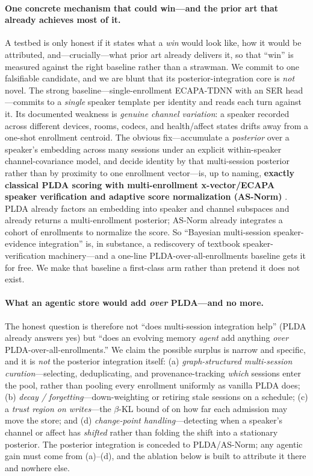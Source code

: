 \paragraph{One concrete mechanism that could win---and the prior art that already achieves most of it.} A testbed is only honest if it states what a \emph{win} would look like, how it would be attributed, and---crucially---what prior art already delivers it, so that ``win'' is measured against the right baseline rather than a strawman. We commit to one falsifiable candidate, and we are blunt that its posterior-integration core is \emph{not} novel. The strong baseline---single-enrollment ECAPA-TDNN with an SER head---commits to a \emph{single} speaker template per identity and reads each turn against it. Its documented weakness is \emph{genuine channel variation}: a speaker recorded across different devices, rooms, codecs, and health/affect states drifts away from a one-shot enrollment centroid. The obvious fix---accumulate a \emph{posterior} over a speaker's embedding across many sessions under an explicit within-speaker channel-covariance model, and decide identity by that multi-session posterior rather than by proximity to one enrollment vector---is, up to naming, \textbf{exactly classical PLDA scoring with multi-enrollment x-vector/ECAPA speaker verification and adaptive score normalization (AS-Norm)} \citep{xvector2021,ecapatdnn2020}. PLDA already factors an embedding into speaker and channel subspaces and already returns a multi-enrollment posterior; AS-Norm already integrates a cohort of enrollments to normalize the score. So ``Bayesian multi-session speaker-evidence integration'' is, in substance, a rediscovery of textbook speaker-verification machinery---and a one-line PLDA-over-all-enrollments baseline gets it for free. We make that baseline a first-class arm rather than pretend it does not exist.

\paragraph{What an agentic store would add \emph{over} PLDA---and no more.} The honest question is therefore not ``does multi-session integration help'' (PLDA already answers yes) but ``does an evolving memory \emph{agent} add anything \emph{over} PLDA-over-all-enrollments.'' We claim the possible surplus is narrow and specific, and it is \emph{not} the posterior integration itself: (a) \emph{graph-structured multi-session curation}---selecting, deduplicating, and provenance-tracking \emph{which} sessions enter the pool, rather than pooling every enrollment uniformly as vanilla PLDA does; (b) \emph{decay / forgetting}---down-weighting or retiring stale sessions on a schedule; (c) a \emph{trust region on writes}---the $\beta$-KL bound of  on how far each admission may move the store; and (d) \emph{change-point handling}---detecting when a speaker's channel or affect has \emph{shifted} rather than folding the shift into a stationary posterior. The posterior integration is conceded to PLDA/AS-Norm; any agentic gain must come from (a)--(d), and the ablation below is built to attribute it there and nowhere else.

